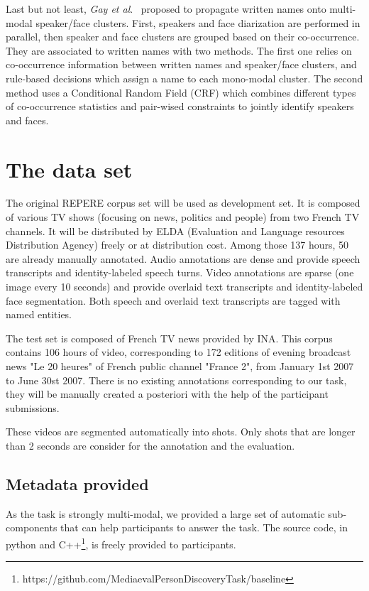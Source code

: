 \documentclass{acm_proc_article-me}
\begin{document}
Last but not least, \textit{Gay et al}.~\cite{GAY--CBMI--2014} proposed to propagate written names onto multi-modal speaker/face clusters. First, speakers and face diarization are performed in parallel, then speaker and face clusters are grouped based on their co-occurrence. They are associated to written names with two methods. The first one relies on co-occurrence information between written names and speaker/face clusters, and rule-based decisions which assign a name to each mono-modal cluster. The second method uses a Conditional Random Field (CRF) which combines different types of co-occurrence statistics and pair-wised constraints to jointly identify speakers and faces.


\section{The data set}

The original REPERE corpus set will be used as development set. It is composed of various TV shows (focusing on news, politics and people) from two French TV channels. It will be distributed by ELDA (Evaluation and Language resources Distribution Agency) freely or at distribution cost. Among those 137 hours, 50 are already manually annotated. Audio annotations are dense and provide speech transcripts and identity-labeled speech turns. Video annotations are sparse (one image every 10 seconds) and provide overlaid text transcripts and identity-labeled face segmentation. Both speech and overlaid text transcripts are tagged with named entities.

The test set is composed of French TV news provided by INA. This corpus contains 106 hours of video, corresponding to 172 editions of evening broadcast news "Le 20 heures" of French public channel "France 2", from January 1st 2007 to June 30st 2007. There is no existing annotations corresponding to our task, they will be manually created a posteriori with the help of the participant submissions.

These videos are segmented automatically into shots. Only shots that are longer than 2 seconds are consider for the annotation and the evaluation.

\subsection{Metadata provided}

As the task is strongly multi-modal, we provided a large set of automatic sub-components that can help participants to answer the task. The source code, in python and C++\footnote{https://github.com/MediaevalPersonDiscoveryTask/baseline}, is freely provided to participants. 
\end{document}
